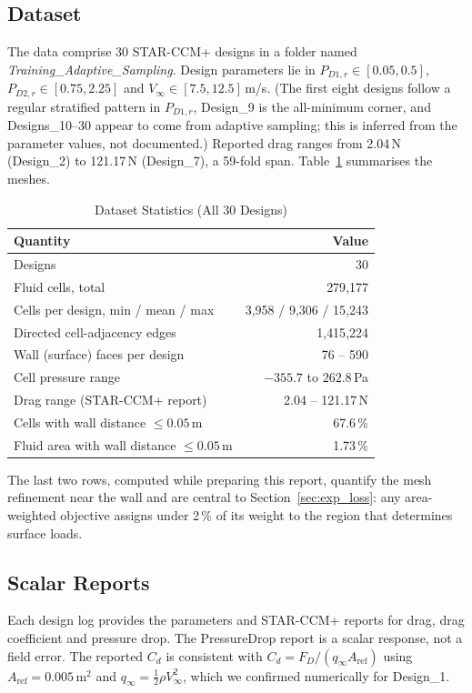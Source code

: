 \documentclass[journal]{IEEEtran}
\newcommand{\pdone}{P_{D1,r}}
\newcommand{\pdtwo}{P_{D2,r}}
\newcommand{\Vin}{V_{\infty}}
\begin{document}
\subsection{Dataset}
The data comprise 30 STAR-CCM+ designs in a folder named
\emph{Training\_Adaptive\_Sampling}. Design parameters lie in
$\pdone\in[0.05,0.5]$, $\pdtwo\in[0.75,2.25]$ and $\Vin\in[7.5,12.5]$\,m/s.
(The first eight designs follow a regular stratified pattern in $\pdone$,
Design\_9 is the all-minimum corner, and Designs\_10--30 appear to come from
adaptive sampling; this is inferred from the parameter values, not documented.)
Reported drag ranges from 2.04\,N (Design\_2) to 121.17\,N (Design\_7), a
59-fold span. Table~\ref{tab:data} summarises the meshes.

\begin{table}[!t]
\centering
\caption{Dataset Statistics (All 30 Designs)}
\label{tab:data}
\begin{tabular}{lr}
\toprule
Quantity & Value \\
\midrule
Designs & 30 \\
Fluid cells, total & 279{,}177 \\
Cells per design, min / mean / max & 3{,}958 / 9{,}306 / 15{,}243 \\
Directed cell-adjacency edges & 1{,}415{,}224 \\
Wall (surface) faces per design & 76 -- 590 \\
Cell pressure range & $-355.7$ to $262.8$\,Pa \\
Drag range (STAR-CCM+ report) & 2.04 -- 121.17\,N \\
Cells with wall distance $\le0.05$\,m & 67.6\,\% \\
Fluid area with wall distance $\le0.05$\,m & 1.73\,\% \\
\bottomrule
\end{tabular}
\end{table}

The last two rows, computed while preparing this report, quantify the mesh
refinement near the wall and are central to Section~\ref{sec:exp_loss}: any
area-weighted objective assigns under 2\,\% of its weight to the region that
determines surface loads.

\subsection{Scalar Reports}
Each design log provides the parameters and STAR-CCM+ reports for drag, drag
coefficient and pressure drop. The PressureDrop report is a scalar response,
not a field error. The reported $C_d$ is consistent with $C_d=F_D/(q_\infty
A_\mathrm{ref})$ using $A_\mathrm{ref}=0.005$\,m$^2$ and
$q_\infty=\tfrac12\rho\Vin^2$, which we confirmed numerically for Design\_1.
\end{document}
